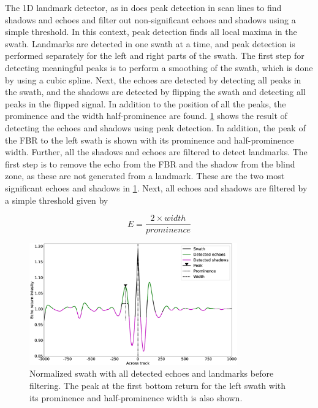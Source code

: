 The 1D landmark detector, as in \cite{Al-Rawi2017LandmarkImages,} does peak detection in scan lines to find shadows and echoes and filter out non-significant echoes and shadows using a simple threshold. In this context, peak detection finds all local maxima in the swath. Landmarks are detected in one swath at a time, and peak detection is performed separately for the left and right parts of the swath. The first step for detecting meaningful peaks is to perform a smoothing of the swath, which is done by using a cubic spline. Next, the echoes are detected by detecting all peaks in the swath, and the shadows are detected by flipping the swath and detecting all peaks in the flipped signal. In addition to the position of all the peaks, the prominence and the width half-prominence are found. \cref{fig:1D_swath_w_landmarks} shows the result of detecting the echoes and shadows using peak detection. In addition, the peak of the FBR to the left swath is shown with its prominence and half-prominence width.
Further, all the shadows and echoes are filtered to detect landmarks. The first step is to remove the echo from the FBR and the shadow from the blind zone, as these are not generated from a landmark. These are the two most significant echoes and shadows in \cref{fig:1D_swath_w_landmarks}. Next, all echoes and shadows are filtered by a simple threshold given by

\begin{equation}
    E = \frac{2\times width}{prominence}
    \label{eq:1D_thres}
\end{equation}

\begin{figure}
    \centering
    \includegraphics[width=0.8\textwidth]{figures/1D_swath_w_landmarks.eps}
    \caption{Normalized swath with all detected echoes and landmarks before filtering. The peak at the first bottom return for the left swath with its prominence and half-prominence width is also shown.}
    \label{fig:1D_swath_w_landmarks}
\end{figure}


